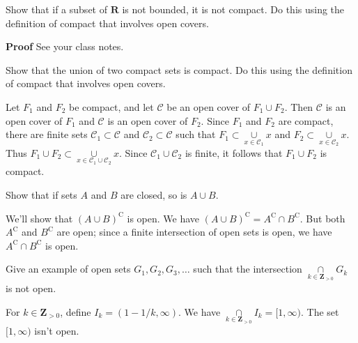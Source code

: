 \documentclass[12pt,fleqn,answers]{exam}
\newcommand{\reals}{\mathbf{R}}
\newcommand{\integers}{\mathbf{Z}}
\begin{document}
\begin{questions}
\question   Show that if a subset of \(\reals\) is not bounded, it
is not compact. Do this using the definition of compact that involves
open covers.

\begin{solution}
\textbf{Proof} See your class notes.
\end{solution}






\question   Show that the union of two compact sets is compact.  Do
this using  the definition of compact that involves
open covers.

\begin{solution}
 Let \(F_1\) and \(F_2\) be compact, and let
\(\mathcal{C}\) be an open cover of \(F_1 \cup  F_2\). Then
\(\mathcal{C}\) is an open cover of \(F_1\) and \(\mathcal{C}\) is an
open cover of \(F_2\). Since \(F_1\) and \(F_2\) are compact,
there are finite sets \(\mathcal{C}_1 \subset \mathcal{C}\) and
\(\mathcal{C}_2 \subset \mathcal{C}\) such that 
\(
  F_1 \subset \underset{x \in \mathcal{C}_1}{\cup} x\) and
\(
  F_2 \subset \underset{x \in \mathcal{C}_2}{\cup} x.
\)
Thus
\(\displaystyle
   F_1 \cup  F_2  \subset \underset{x \in \mathcal{C}_1 \cup \mathcal{C}_2 }{\cup} x
\).
Since \(\mathcal{C}_1 \cup \mathcal{C}_2\) is finite, it follows that 
\( F_1 \cup  F_2 \) is compact.

\end{solution}

\question Show that if sets $A$ and $B$ are closed, so is $A \cup B$.

\begin{solution}
We'll show that $(A \cup B)^{\mathrm{C}}$ is open. We have   $(A \cup B)^{\mathrm{C}} = A^{\mathrm{C}} \cap B^{\mathrm{C}}$. But both $A^{\mathrm{C}}$ and $B^{\mathrm{C}}$ are open;
since a finite intersection of open sets is open, we have $A^{\mathrm{C}} \cap B^{\mathrm{C}}$ is open.

\end{solution}

\question   Give an example of open sets \(G_1, G_2, G_3, \dots \) such that the intersection
\( \displaystyle   \underset{k \in \integers_{> 0}}{\cap} G_k
\) is not open.

\begin{solution}
For \(k \in \integers_{>0}\), define \(I_k = (1-1/k,
\infty)\). We have
\(\displaystyle
  \underset{k \in \integers_{>0}}{\cap} I_k = [1,\infty).
\)
The set \([1,\infty)\) isn't open.


\end{solution}
\end{questions}
\end{document}
